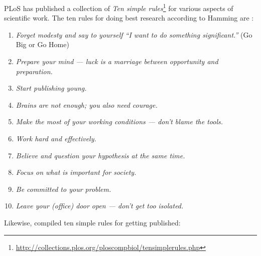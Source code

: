 \documentclass[graybox,envcountchap,sectrefs,UStrade]{svmono}
\begin{document}
PLoS has published a collection of \emph{Ten simple rules}\footnote{\url{http://collections.plos.org/ploscompbiol/tensimplerules.php}} for various aspects of scientific work. The ten rules for doing best research according to Hamming are \citep{Erren2007PLoS}:

\begin{enumerate}
  \item \emph{Forget modesty and say to yourself ``I want to do something significant.''} (Go Big or Go Home)
  \item \emph{Prepare your mind --- luck is a marriage between opportunity and preparation.}
  \item \emph{Start publishing young.}
  \item \emph{Brains are not enough; you also need courage.}
  \item \emph{Make the most of your working conditions --- don't blame the tools.}
  \item \emph{Work hard and effectively.}
  \item \emph{Believe and question your hypothesis at the same time.}
  \item \emph{Focus on what is important for society.}
  \item \emph{Be committed to your problem.}
  \item \emph{Leave your (office) door open --- don't get too isolated.}
\end{enumerate}

Likewise, \citet{Bourne2005} compiled ten simple rules for getting published:\label{sec:bourne_rules}
\end{document}
